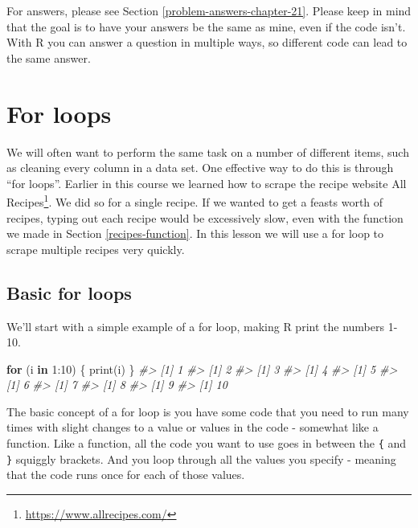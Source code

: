 \documentclass[
]{krantz}
\makeatletter
\newenvironment{Shaded}{\begin{snugshade}}{\end{snugshade}}
\newcommand{\CommentTok}[1]{\textcolor[rgb]{0.37,0.37,0.37}{\textit{#1}}}
\newcommand{\ControlFlowTok}[1]{\textcolor[rgb]{0.27,0.27,0.27}{\textbf{#1}}}
\newcommand{\DecValTok}[1]{\textcolor[rgb]{0.06,0.06,0.06}{#1}}
\newcommand{\FunctionTok}[1]{\textcolor[rgb]{0,0,0}{#1}}
\newcommand{\NormalTok}[1]{#1}
\newcommand{\SpecialCharTok}[1]{\textcolor[rgb]{0,0,0}{#1}}
\renewcommand{\href}[2]{#2\footnote{\url{#1}}}
\newenvironment{kframe}{%
\medskip{}
\setlength{\fboxsep}{.8em}
 \def\at@end@of@kframe{}%
 \ifinner\ifhmode%
  \def\at@end@of@kframe{\end{minipage}}%
  \begin{minipage}{\columnwidth}%
 \fi\fi%
 \def\FrameCommand##1{\hskip\@totalleftmargin \hskip-\fboxsep
 \colorbox{shadecolor}{##1}\hskip-\fboxsep
     \hskip-\linewidth \hskip-\@totalleftmargin \hskip\columnwidth}%
 \MakeFramed {\advance\hsize-\width
   \@totalleftmargin\z@ \linewidth\hsize
   \@setminipage}}%
 {\par\unskip\endMakeFramed%
 \at@end@of@kframe}
\renewenvironment{Shaded}{\begin{kframe}}{\end{kframe}}
\makeatother
\begin{document}
For answers, please see Section \ref{problem-answers-chapter-21}. Please keep in mind that the goal is to have your answers be the same as mine, even if the code isn't. With R you can answer a question in multiple ways, so different code can lead to the same answer.

\hypertarget{for-loops}{%
\chapter{For loops}\label{for-loops}}

We will often want to perform the same task on a number of different items, such as cleaning every column in a data set. One effective way to do this is through ``for loops''. Earlier in this course we learned how to scrape the recipe website \href{https://www.allrecipes.com/}{All Recipes}. We did so for a single recipe. If we wanted to get a feasts worth of recipes, typing out each recipe would be excessively slow, even with the function we made in Section \ref{recipes-function}. In this lesson we will use a for loop to scrape multiple recipes very quickly.

\hypertarget{basic-for-loops}{%
\section{Basic for loops}\label{basic-for-loops}}

We'll start with a simple example of a for loop, making R print the numbers 1-10.

\begin{Shaded}
\begin{Highlighting}[]
\ControlFlowTok{for}\NormalTok{ (i }\ControlFlowTok{in} \DecValTok{1}\SpecialCharTok{:}\DecValTok{10}\NormalTok{) \{}
   \FunctionTok{print}\NormalTok{(i)}
\NormalTok{\}}
\CommentTok{\#\textgreater{} [1] 1}
\CommentTok{\#\textgreater{} [1] 2}
\CommentTok{\#\textgreater{} [1] 3}
\CommentTok{\#\textgreater{} [1] 4}
\CommentTok{\#\textgreater{} [1] 5}
\CommentTok{\#\textgreater{} [1] 6}
\CommentTok{\#\textgreater{} [1] 7}
\CommentTok{\#\textgreater{} [1] 8}
\CommentTok{\#\textgreater{} [1] 9}
\CommentTok{\#\textgreater{} [1] 10}
\end{Highlighting}
\end{Shaded}

The basic concept of a for loop is you have some code that you need to run many times with slight changes to a value or values in the code - somewhat like a function. Like a function, all the code you want to use goes in between the \texttt{\{} and \texttt{\}} squiggly brackets. And you loop through all the values you specify - meaning that the code runs once for each of those values.
\end{document}
